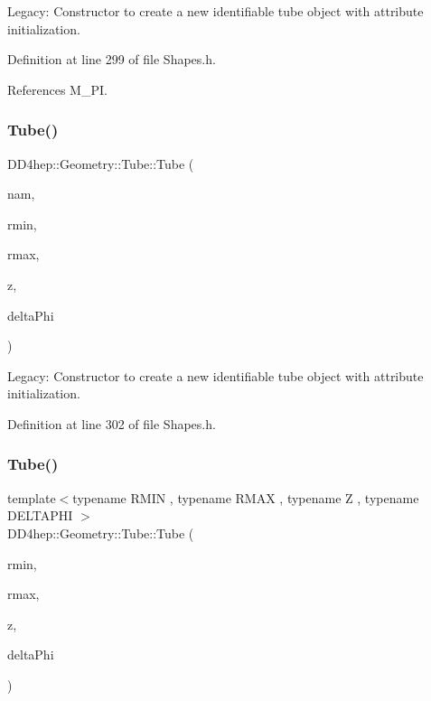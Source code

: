 Legacy\+: Constructor to create a new identifiable tube object with attribute initialization. 



Definition at line 299 of file Shapes.\+h.



References M\+\_\+\+PI.

\hypertarget{class_d_d4hep_1_1_geometry_1_1_tube_a30ea96e53731054bcad134f3734aa958}{}\label{class_d_d4hep_1_1_geometry_1_1_tube_a30ea96e53731054bcad134f3734aa958} 
\subsubsection{\texorpdfstring{Tube()}{Tube()}\hspace{0.1cm}{\footnotesize\ttfamily [9/10]}}
{\footnotesize\ttfamily D\+D4hep\+::\+Geometry\+::\+Tube\+::\+Tube (\begin{DoxyParamCaption}\item[{const std\+::string \&}]{nam,  }\item[{double}]{rmin,  }\item[{double}]{rmax,  }\item[{double}]{z,  }\item[{double}]{delta\+Phi }\end{DoxyParamCaption})\hspace{0.3cm}{\ttfamily [inline]}}



Legacy\+: Constructor to create a new identifiable tube object with attribute initialization. 



Definition at line 302 of file Shapes.\+h.

\hypertarget{class_d_d4hep_1_1_geometry_1_1_tube_a44a3b5299c2945bf0dd6aecdeaf7499c}{}\label{class_d_d4hep_1_1_geometry_1_1_tube_a44a3b5299c2945bf0dd6aecdeaf7499c} 
\subsubsection{\texorpdfstring{Tube()}{Tube()}\hspace{0.1cm}{\footnotesize\ttfamily [10/10]}}
{\footnotesize\ttfamily template$<$typename R\+M\+IN , typename R\+M\+AX , typename Z , typename D\+E\+L\+T\+A\+P\+HI $>$ \\
D\+D4hep\+::\+Geometry\+::\+Tube\+::\+Tube (\begin{DoxyParamCaption}\item[{const R\+M\+IN \&}]{rmin,  }\item[{const R\+M\+AX \&}]{rmax,  }\item[{const Z \&}]{z,  }\item[{const D\+E\+L\+T\+A\+P\+HI \&}]{delta\+Phi }\end{DoxyParamCaption})\hspace{0.3cm}{\ttfamily [inline]}}



